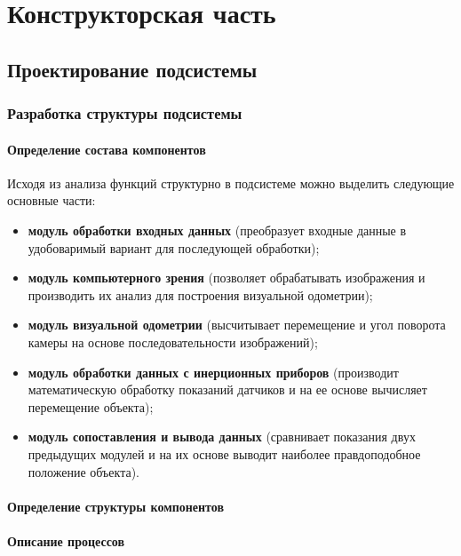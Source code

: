 \newpage

\section{Конструкторская часть}



\subsection{Проектирование подсистемы}
\subsubsection{Разработка структуры подсистемы}
\paragraph{Определение состава компонентов}

Исходя из анализа функций структурно в подсистеме можно выделить следующие основные части:
\begin{itemize}
\item \textbf{модуль обработки входных данных} (преобразует входные данные в удобоваримый вариант для последующей обработки);
\item \textbf{модуль компьютерного зрения }(позволяет обрабатывать изображения и производить их анализ для построения визуальной одометрии);
\item \textbf{модуль визуальной одометрии} (высчитывает перемещение и угол поворота камеры на основе последовательности изображений);
\item \textbf{модуль обработки данных с инерционных приборов} (производит математическую обработку показаний датчиков и на ее основе вычисляет перемещение объекта);
\item \textbf{модуль сопоставления  и вывода данных} (сравнивает показания двух предыдущих модулей и на их основе выводит наиболее правдоподобное положение объекта).
\end{itemize}

\paragraph{Определение структуры компонентов}

\paragraph{Описание процессов}

